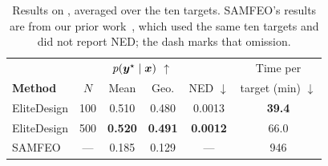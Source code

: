 \begin{table}[t]
\centering
\renewcommand{\arraystretch}{1.1}
\setlength{\tabcolsep}{3pt}
\begin{tabular}{@{}lccccc@{}}
\toprule
& & \multicolumn{2}{c}{$p(\boldsymbol{{y}}^\star\mid\boldsymbol{{x}})$ $\uparrow$} & & Time per \\
\cmidrule(lr){3-4}
\textbf{Method} & $N$ & Mean & Geo. & NED $\downarrow$ & \shortstack{target\\(min) $\downarrow$} \\
\midrule
EliteDesign & 100 & 0.510 & 0.480 & 0.0013 & \textbf{39.4} \\
EliteDesign & 500 & \textbf{0.520} & \textbf{0.491} & \textbf{0.0012} & 66.0 \\
\midrule
SAMFEO & --- & 0.185 & 0.129 & --- & 946 \\
\bottomrule
\end{tabular}
\caption{Results on \sixteenS{}, averaged over the ten targets. SAMFEO's results are from our prior work~\citep{zhou2026fastdesign}, which used the same ten targets and did not report NED; the dash marks that omission.}
\label{tab:16s-results}
\end{table}
